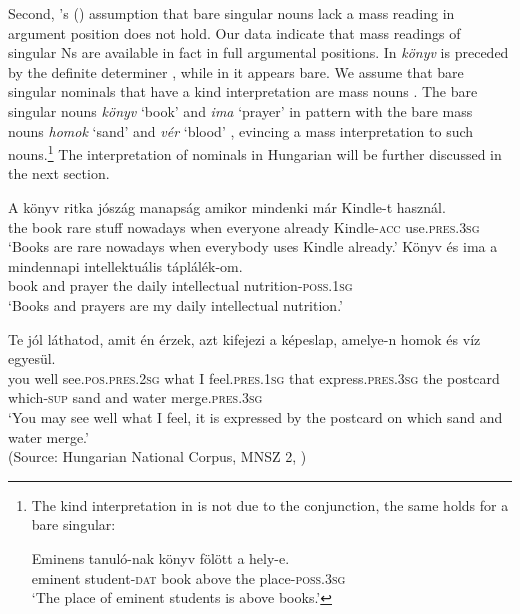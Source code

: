 \documentclass[output=paper]{langscibook}
\begin{document}
\noindent Second, \citeauthor{erbach-etal-19}’s (\citeyear{erbach-etal-19}) assumption that bare singular nouns lack a mass reading in argument position does not hold. Our data indicate that mass readings of singular Ns are available in fact in full argumental positions. In  \textit{könyv} is preceded by the definite determiner , while in  it appears bare. We assume that bare singular nominals that have a kind interpretation are mass nouns \citep{chierchia-98b}. The bare singular nouns \textit{könyv} `book' and \textit{ima} `prayer' in  pattern with the bare mass nouns \textit{homok} `sand' and \textit{vér} `blood' , evincing a mass interpretation to such nouns.\footnote{The kind interpretation in  is not due to the conjunction, the same holds for a bare singular: 

\ea
\gll Eminens tanuló-nak könyv fölött a hely-e. \\
eminent student-\textsc{dat} book above the place-\textsc{poss}.\textsc{3sg} \\
\glt `The place of eminent students is above books.'
\z
} The interpretation of nominals in Hungarian will be further discussed in the next section.


\ea \label{schv-nem:ex:34}
\gll A könyv ritka jószág manapság amikor mindenki már Kindle-t használ. \\  
 the book rare stuff nowadays when everyone already Kindle-\textsc{acc} use.\textsc{pres}.\textsc{3sg}\\ 
\glt `Books are rare  nowadays when everybody uses Kindle already.'
\ex \label{schv-nem:ex:35}
\gll Könyv és ima a mindennapi intellektuális táplálék-om.%
\\  
book   and  prayer  the daily      intellectual    nutrition-\textsc{poss}.\textsc{1sg}\\ 
\glt `Books and prayers are my daily intellectual nutrition.'
\z


\ea \label{schv-nem:ex:36}
\gll Te jól láthatod, amit én érzek, azt kifejezi a képeslap, amelye-n homok és víz egyesül.\\  
 you well see.\textsc{pos}.\textsc{pres}.\textsc{2sg}  what I feel.\textsc{pres}.\textsc{1sg} that express.\textsc{pres}.\textsc{3sg} the postcard which-\textsc{sup} sand and water merge.\textsc{pres}.\textsc{3sg}\\ 
\glt `You may see well what I feel, it is expressed by the postcard on which sand and water merge.' \\\hfill (Source: Hungarian National Corpus, MNSZ 2, \citealt{oravecz-14})
\z
\end{document}
